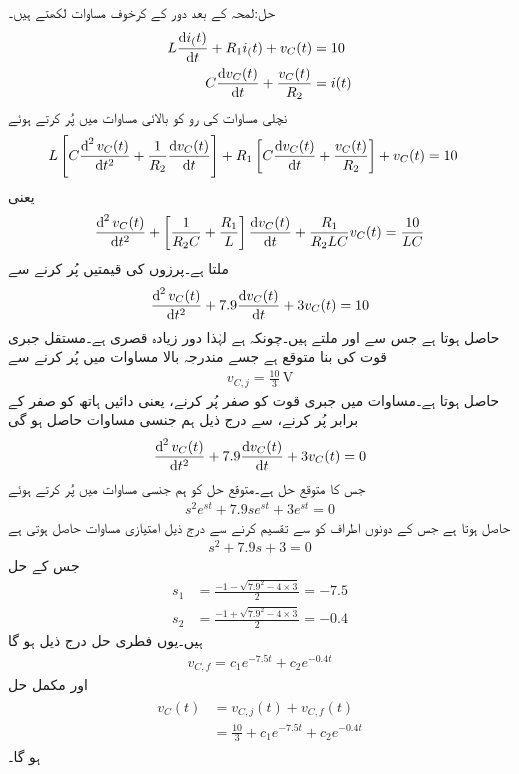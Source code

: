 حل:لمحہ  کے بعد دور کے کرخوف مساوات لکھتے ہیں۔
\begin{align*}
L\frac{\dif i_(t)}{\dif t}+R_1 i_(t)+v_C(t)&=10\\
C\frac{\dif v_C(t)}{\dif t}+\frac{v_C(t)}{R_2}&=i(t)
\end{align*}
نچلی مساوات کی رو کو بالائی مساوات  میں پُر کرتے  ہوئے
\begin{align*}
L\left[C\frac{\dif^{\,2} v_C(t)}{\dif t^2}+\frac{1}{R_2}\frac{\dif v_C(t)}{\dif t}\right]+R_1 \left[C\frac{\dif v_C(t)}{\dif t}+\frac{v_C(t)}{R_2} \right]+v_C(t)&=10
\end{align*}
یعنی
\begin{align*}
\frac{\dif^{\,2} v_C(t)}{\dif t^2}+\left[\frac{1}{R_2 C}+\frac{R_1}{L}\right]\frac{\dif v_C(t)}{\dif t}+\frac{R_1}{R_2 LC}v_C(t)=\frac{10}{LC}
\end{align*}
ملتا ہے۔پرزوں کی قیمتیں پُر کرنے سے
\begin{align}\label{مساوات_عارضی_زیادہ_قصری_مثال_الف}
\frac{\dif^{\,2} v_C(t)}{\dif t^2}+7.9 \frac{\dif v_C(t)}{\dif t}+3 v_C(t)=10
\end{align}
حاصل ہوتا ہے جس سے  اور  ملتے ہیں۔چونکہ  ہے لہٰذا دور زیادہ قصری ہے۔مستقل جبری قوت کی بنا  متوقع ہے جسے مندرجہ بالا مساوات میں پُر کرنے سے
\begin{align*}
v_{C,j}=\frac{10}{3} \, \si{\volt}
\end{align*}
حاصل ہوتا ہے۔مساوات  میں جبری قوت کو صفر پُر کرنے، یعنی دائیں ہاتھ کو صفر کے برابر پُر کرنے، سے درج ذیل ہم جنسی مساوات حاصل ہو گی
\begin{align*}
\frac{\dif^{\,2} v_C(t)}{\dif t^2}+7.9 \frac{\dif v_C(t)}{\dif t}+3 v_C(t)=0
\end{align*}
جس کا متوقع حل  ہے۔متوقع حل کو ہم جنسی مساوات میں پُر کرتے ہوئے
\begin{align*}
s^2 e^{st}+7.9 s e^{st}+3 e^{st}=0
\end{align*}
حاصل ہوتا ہے جس کے دونوں اطراف کو  سے تقسیم کرنے سے درج ذیل امتیازی مساوات حاصل ہوتی ہے
\begin{align*}
s^2+7.9s+3=0
\end{align*}
جس کے حل
\begin{align*}
s_1&=\frac{-1-\sqrt{7.9^2-4\times 3}}{2}=-7.5\\
s_2&=\frac{-1+\sqrt{7.9^2-4\times 3}}{2}=-0.4
\end{align*}
ہیں۔یوں فطری حل درج ذیل ہو گا
\begin{align*}
v_{C,f}=c_1 e^{-7.5t}+c_2e^{-0.4t}
\end{align*}
اور مکمل حل
\begin{gather}
\begin{aligned}\label{مساوات_عارضی_زیادہ_قصری_مثال_ب}
v_C(t)&=v_{C,j}(t)+v_{C,f}(t)\\
&=\frac{10}{3}+c_1 e^{-7.5t}+c_2e^{-0.4t}
\end{aligned}
\end{gather}
ہو گا۔

